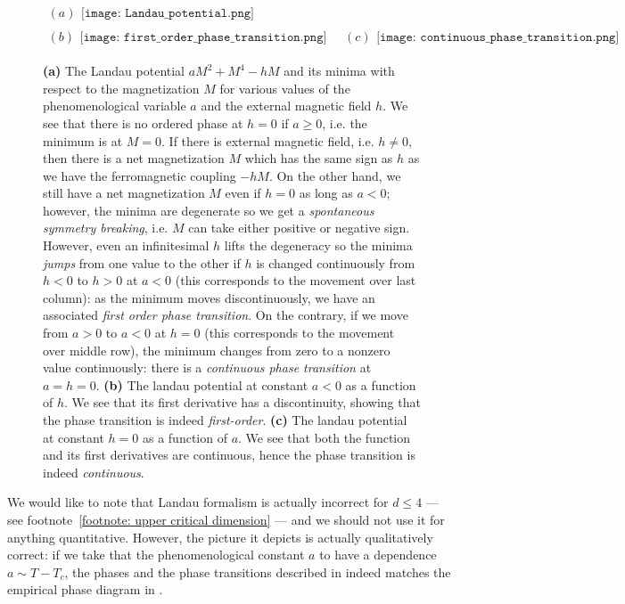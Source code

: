 \begin{figure}
	\centering 
	\begin{gather*}
		(a)\begin{aligned}\texttt{[image: Landau\_potential.png]}
		\end{aligned}\\(b)\begin{aligned}\texttt{[image: first\_order\_phase\_transition.png]}\end{aligned}\quad
		(c)\begin{aligned}\texttt{[image: continuous\_phase\_transition.png]}
		\end{aligned}
	\end{gather*}
	\caption[Phase transitions in the Landau formalism]{\label{fig: landau potential and phase transitions}\textbf{(a)} The Landau potential $a M^2+M^4-hM$ and its minima with respect to the magnetization $M$ for various values of the phenomenological variable $a$ and the external magnetic field $h$. We see that there is no ordered phase at $h=0$ if $a\ge 0$, i.e. the minimum is at $M=0$. If there is  external magnetic field, i.e. $h\ne 0$, then there is a net magnetization $M$ which has the same sign as $h$ as we have the ferromagnetic coupling $-h M$. On the other hand, we still have a net magnetization $M$ even if $h=0$ as long as $a<0$; however, the minima are degenerate so we get a \emph{spontaneous symmetry breaking}, i.e. $M$ can take either positive or negative sign. However, even an infinitesimal $h$ lifts the degeneracy so the minima \emph{jumps} from one value to the other if $h$ is changed continuously from $h<0$ to $h>0$ at $a<0$ (this corresponds to the movement over last column): as the minimum moves discontinuously, we have an associated \emph{first order phase transition}. On the contrary, if we move from $a>0$ to $a<0$ at $h=0$ (this corresponds to the movement over middle row), the minimum changes from zero to a nonzero value continuously: there is a \emph{continuous phase transition} at $a=h=0$. \textbf{(b)} The landau potential at constant $a<0$ as a function of $h$. We see that its first derivative has a discontinuity, showing that the phase transition is indeed \emph{first-order}. \textbf{(c)} The landau potential at constant $h=0$ as a function of $a$. We see that both the function and its first derivatives are continuous, hence the phase transition is indeed \emph{continuous}.
	}
\end{figure}
We would like to note that Landau formalism is actually incorrect for $d\le 4$ --- see footnote~\ref{footnote: upper critical dimension} --- and we should not use it for anything quantitative. However, the picture it depicts is actually qualitatively correct: if we take that the phenomenological constant $a$ to have a dependence \mbox{$a\sim T-T_c$}, the phases and the phase transitions described in \figref{\ref{fig: landau potential and phase transitions}} indeed matches the empirical phase diagram in \figref{\ref{fig: phase diagram}}.


